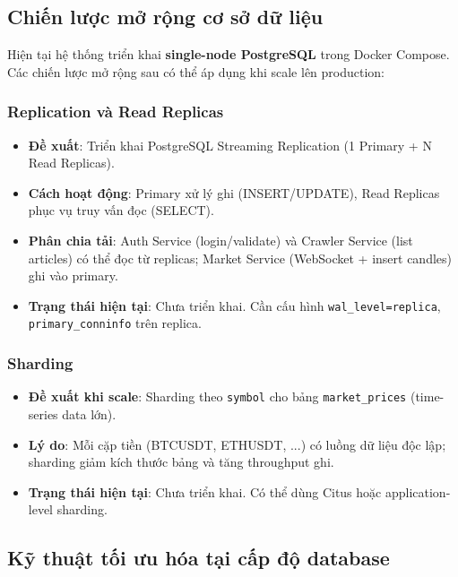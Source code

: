 \subsection{Chiến lược mở rộng cơ sở dữ liệu}

Hiện tại hệ thống triển khai \textbf{single-node PostgreSQL} trong Docker Compose. Các chiến lược mở rộng sau có thể áp dụng khi scale lên production:

\subsubsection{Replication và Read Replicas}

\begin{itemize}
    \item \textbf{Đề xuất}: Triển khai PostgreSQL Streaming Replication (1 Primary + N Read Replicas).
    \item \textbf{Cách hoạt động}: Primary xử lý ghi (INSERT/UPDATE), Read Replicas phục vụ truy vấn đọc (SELECT).
    \item \textbf{Phân chia tải}: Auth Service (login/validate) và Crawler Service (list articles) có thể đọc từ replicas; Market Service (WebSocket + insert candles) ghi vào primary.
    \item \textbf{Trạng thái hiện tại}: Chưa triển khai. Cần cấu hình \texttt{wal\_level=replica}, \texttt{primary\_conninfo} trên replica.
\end{itemize}

\subsubsection{Sharding}

\begin{itemize}
    \item \textbf{Đề xuất khi scale}: Sharding theo \texttt{symbol} cho bảng \texttt{market\_prices} (time-series data lớn).
    \item \textbf{Lý do}: Mỗi cặp tiền (BTCUSDT, ETHUSDT, ...) có luồng dữ liệu độc lập; sharding giảm kích thước bảng và tăng throughput ghi.
    \item \textbf{Trạng thái hiện tại}: Chưa triển khai. Có thể dùng Citus hoặc application-level sharding.
\end{itemize}

\subsection{Kỹ thuật tối ưu hóa tại cấp độ database}

